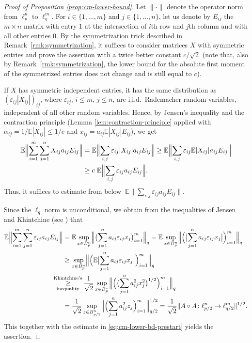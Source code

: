 \documentclass[a4paper]{amsart}
\theoremstyle{definition}
\theoremstyle{remark}
\numberwithin{equation}{section}
\newcommand*{\EE}{\mathbb{E}}
\newcommand*{\hadprod}{\mathbin{\circ}} %
\begin{document}
\begin{proof}[Proof of Proposition \ref{prop:cm-lower-bound}]
Let $\| \cdot\|$ denote the operator norm from $\ell_{p}^n$ to $\ell_q^m$. For $i\in\{1,\dots,m\}$ and $j\in\{1,\dots,n \}$, let us denote by $E_{ij}$  the $m\times n$ matrix with entry $1$ at the intersection of $i$th row and $j$th column and with all other entries $0$.
	By the symmetrization trick described in Remark~\ref{rmk:symmetrization},
	 it suffices to consider matrices $X$ with symmetric entries
	 and  prove the assertion with a twice better constant $c/\sqrt 2$
	 (note that, also by Remark~\ref{rmk:symmetrization}, the lower bound for the absolute first moment of the symmetrized entries does not change and is still equal to $c$). 

If $X$ has symmetric independent entries, it has the same distribution as $(\varepsilon_{ij}|X_{ij}|)_{ij}$, where $\varepsilon_{ij}$, $i\leq m$, $j\leq n$, are i.i.d.~Rademacher random variables, independent of all other random variables. 
Hence,
 by Jensen's inequality and the contraction principle (Lemma \ref{lem:contraction-principle} applied  with $\alpha_{ij} = 1/\EE|X_{ij}| \le 1/c$ and $x_{ij}=a_{ij}\EE|X_{ij}| E_{ij}$), we get
\begin{align} \label{eq:cm-lower-bd-prestart}\nonumber
\EE \Bigl\|\sum_{i=1}^m \sum_{j=1}^n X_{ij} a_{ij}E_{ij} \Bigr\|
& \nonumber
= \EE \Bigl\|\sum_{i,j}\varepsilon_{ij}|X_{ij}|a_{ij}E_{ij} \Bigr\|
\ge \EE \Bigl\|\sum_{i,j} \varepsilon_{ij}\EE|X_{ij}|a_{ij} E_{ij} \Bigr\|  \\ &
\ge c\ \EE \Bigl\|\sum_{i,j} \varepsilon_{ij}a_{ij} E_{ij} \Bigr\|.
\end{align}
Thus, it suffices to estimate from below $\ \EE\|\sum_{i,j} \varepsilon_{ij}a_{ij} E_{ij} \|$.

Since the $\ell_q$ norm is unconditional, we obtain from the inequalities of Jensen and Khintchine (see \cite{Haagerup}) that
	\begin{align*}
		\EE\Bigl\|\sum_{i=1}^m \sum_{j=1}^n \varepsilon_{ij}a_{ij} E_{ij} \Bigr\|
		& = \EE \sup_{x\in B_p^n} \Bigl\| \bigl( \sum_{j=1}^n a_{ij}\varepsilon_{ij} x_j\bigr)_{i=1}^m \Bigr\|_q
		= \EE \sup_{x\in B_p^n} \Bigl\| \Bigl( \bigl| \sum_{j=1}^n a_{ij}\varepsilon_{ij} x_j \bigr|\Bigr)_{i=1}^m \Bigr\|_q \\
		& \geq \sup_{x\in B_p^n} \Bigl\| \Bigl( \EE \bigl| \sum_{j=1}^n a_{ij}\varepsilon_{ij} x_j \bigr|\Bigr)_{i=1}^m \Bigr\|_q\\
		&
		\hspace{-0,55 cm}\mathop{\geq}^{\text{Khintchine's}}_{\text{inequality}}   \frac{1}{\sqrt 2} \sup_{x\in B_p^n} \Bigl\| \Bigl( \bigl( \sum_{j=1}^n a_{ij}^2 x_j^2 \bigr)^{1/2} \Bigr)_{i=1}^m \Bigr\|_q \\
		& =  \frac{1}{\sqrt 2} \sup_{z\in B_{p/2}^n} \Bigl\| \Bigl( \sum_{j=1}^n a_{ij}^2 z_j  \Bigr)_{i=1}^m \Bigr\|_{q/2}^{1/2}
		 = \frac{1}{\sqrt 2} \|A\hadprod A \colon \ell^n_{p/2} \to \ell^m_{q/2} \|^{1/2}.
	\end{align*}
	This together with the estimate in \eqref{eq:cm-lower-bd-prestart} yields the assertion.
\end{proof}
\end{document}
